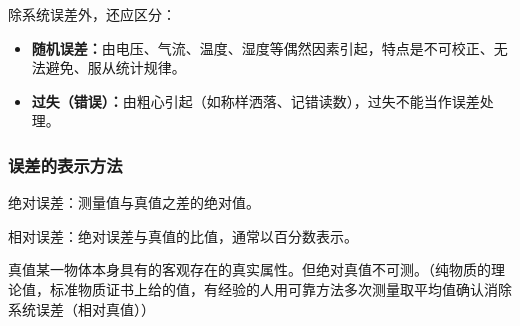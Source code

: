\documentclass[12pt,a4paper]{article}
\numberwithin{equation}{section}
\begin{document}
除系统误差外，还应区分：
\begin{itemize}
    \item \textbf{随机误差：}由电压、气流、温度、湿度等偶然因素引起，特点是不可校正、无法避免、服从统计规律。
    \item \textbf{过失（错误）：}由粗心引起（如称样洒落、记错读数），过失不能当作误差处理。
\end{itemize}
\subsubsection{误差的表示方法}
绝对误差：测量值与真值之差的绝对值。

相对误差：绝对误差与真值的比值，通常以百分数表示。

真值某一物体本身具有的客观存在的真实属性。但绝对真值不可测。（纯物质的理论值，标准物质证书上给的值，有经验的人用可靠方法多次测量取平均值确认消除系统误差（相对真值））
\end{document}
